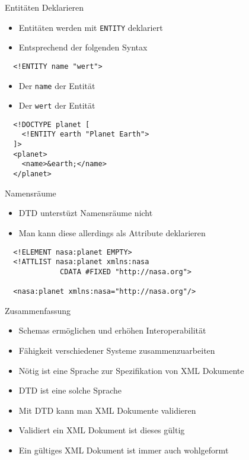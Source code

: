 \documentclass{beamer}
\begin{document}
\begin{frame}[fragile]{Entitäten Deklarieren}
	
	\begin{itemize}
		\item Entitäten werden mit \texttt{ENTITY} deklariert
		\item Entsprechend der folgenden Syntax
	\end{itemize}
	
	\lstset{language=XML}
	\begin{lstlisting}
  <!ENTITY name "wert">
	\end{lstlisting}
	
	\begin{itemize}
		\item Der \texttt{name} der Entität
		\item Der \texttt{wert} der Entität
	\end{itemize}
	
	\begin{lstlisting}
  <!DOCTYPE planet [
    <!ENTITY earth "Planet Earth">
  ]>
  <planet>
    <name>&earth;</name>
  </planet>
	\end{lstlisting}
	
\end{frame}

\begin{frame}[fragile]{Namensräume}
	
	\begin{itemize}
		\item DTD unterstüzt Namensräume nicht
		\item Man kann diese allerdings als Attribute deklarieren
	\end{itemize}
	
	\lstset{language=XML}
	
	\begin{lstlisting}
  <!ELEMENT nasa:planet EMPTY>
  <!ATTLIST nasa:planet xmlns:nasa 
             CDATA #FIXED "http://nasa.org">
	
  <nasa:planet xmlns:nasa="http://nasa.org"/>
	\end{lstlisting}
	
\end{frame}

\begin{frame}{Zusammenfassung}
	
	\begin{itemize}
		\item Schemas ermöglichen und erhöhen Interoperabilität
		\item Fähigkeit verschiedener Systeme zusammenzuarbeiten
		\item Nötig ist eine Sprache zur Spezifikation von XML Dokumente
		\item DTD ist eine solche Sprache
		\item Mit DTD kann man XML Dokumente validieren
		\item Validiert ein XML Dokument ist dieses gültig
		\item Ein gültiges XML Dokument ist immer auch wohlgeformt
	\end{itemize}
	
\end{frame}
\end{document}
